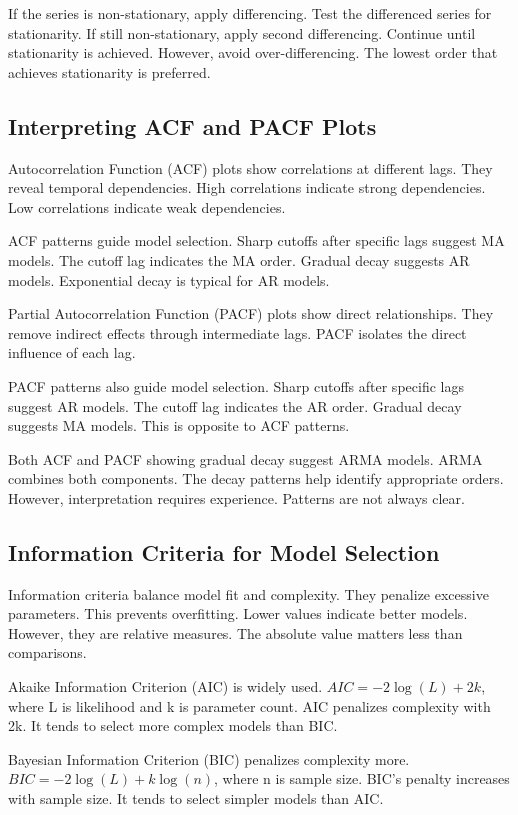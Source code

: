 If the series is non-stationary, apply differencing. Test the differenced series for stationarity. If still non-stationary, apply second differencing. Continue until stationarity is achieved. However, avoid over-differencing. The lowest order that achieves stationarity is preferred.

\subsection{Interpreting ACF and PACF Plots}

Autocorrelation Function (ACF) plots show correlations at different lags. They reveal temporal dependencies. High correlations indicate strong dependencies. Low correlations indicate weak dependencies.

ACF patterns guide model selection. Sharp cutoffs after specific lags suggest MA models. The cutoff lag indicates the MA order. Gradual decay suggests AR models. Exponential decay is typical for AR models.

Partial Autocorrelation Function (PACF) plots show direct relationships. They remove indirect effects through intermediate lags. PACF isolates the direct influence of each lag.

PACF patterns also guide model selection. Sharp cutoffs after specific lags suggest AR models. The cutoff lag indicates the AR order. Gradual decay suggests MA models. This is opposite to ACF patterns.

Both ACF and PACF showing gradual decay suggest ARMA models. ARMA combines both components. The decay patterns help identify appropriate orders. However, interpretation requires experience. Patterns are not always clear.

\subsection{Information Criteria for Model Selection}

Information criteria balance model fit and complexity. They penalize excessive parameters. This prevents overfitting. Lower values indicate better models. However, they are relative measures. The absolute value matters less than comparisons.

Akaike Information Criterion (AIC) is widely used. \(AIC = -2\log(L) + 2k\), where L is likelihood and k is parameter count. AIC penalizes complexity with 2k. It tends to select more complex models than BIC.

Bayesian Information Criterion (BIC) penalizes complexity more. \(BIC = -2\log(L) + k\log(n)\), where n is sample size. BIC's penalty increases with sample size. It tends to select simpler models than AIC.

